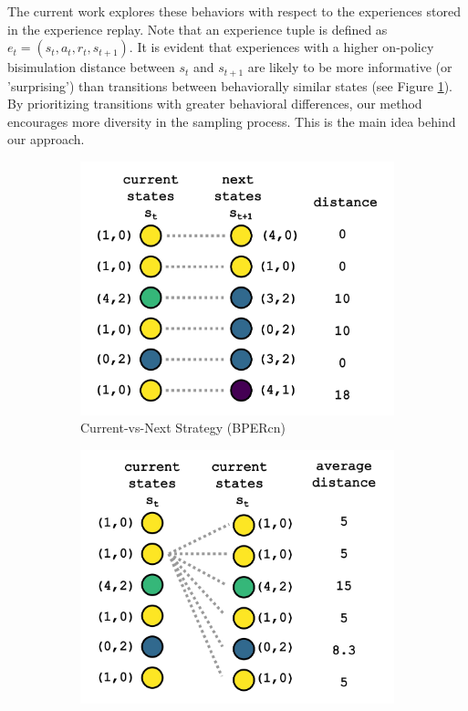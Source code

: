 The current work explores these behaviors with respect to the experiences stored in the experience replay. Note that an experience tuple is defined as \(e_t = (s_t, a_t, r_t, s_{t+1})\). It is evident that experiences with a higher on-policy bisimulation distance between \(s_t\) and \(s_{t+1}\) are likely to be more informative (or 'surprising') than transitions between behaviorally similar states (see Figure \ref{fig:current_vs_next}). By prioritizing transitions with greater behavioral differences, our method encourages more diversity in the sampling process. This is the main idea behind our approach.
\begin{figure}[H]
    \centering
    \begin{subfigure}{0.45\textwidth}
    \includegraphics[width=\linewidth]{Figures/curr_vs_next.jpg}
        \caption{Current-vs-Next Strategy (BPERcn)}
        \label{fig:current_vs_next}
    \end{subfigure}
    \hfill
    \begin{subfigure}{0.45\textwidth}
        \includegraphics[width=\linewidth]{Figures/all_vs_all.jpg}

\end{subfigure}
\end{figure}
